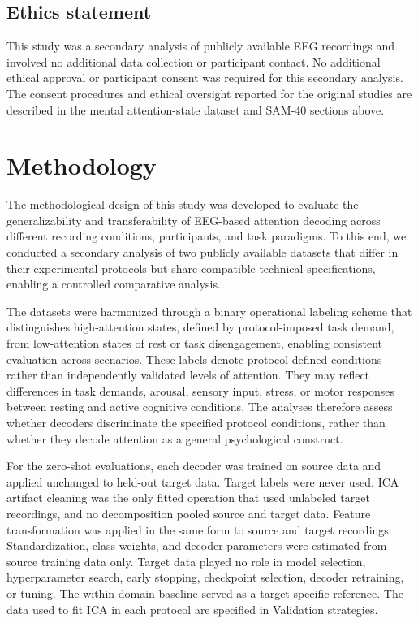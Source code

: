 \documentclass[10pt,letterpaper]{article}
\newcommand{\rev}[1]{#1}
\begin{document}
\subsection*{Ethics statement}

This study was a secondary analysis of publicly available EEG recordings and involved no additional data collection or participant contact. No additional ethical approval or participant consent was required for this secondary analysis. The consent procedures and ethical oversight reported for the original studies are described in the mental attention-state dataset and SAM-40 sections above.

\section*{Methodology}

The methodological design of this study was developed to evaluate the generalizability and transferability of EEG-based attention decoding across different recording conditions, participants, and task paradigms. To this end, we conducted a secondary analysis of two publicly available datasets that differ in their experimental protocols but share compatible technical specifications, enabling a controlled comparative analysis.

\rev{The datasets were harmonized through a binary operational labeling scheme that
distinguishes high-attention states, defined by protocol-imposed task demand,
from low-attention states of rest or task disengagement, enabling consistent
evaluation across scenarios. These labels denote protocol-defined conditions
rather than independently validated levels of attention. They may reflect
differences in task demands, arousal, sensory input, stress, or motor responses
between resting and active cognitive conditions. The analyses therefore assess
whether decoders discriminate the specified protocol conditions, rather than
whether they decode attention as a general psychological construct.}

\rev{For the zero-shot evaluations, each decoder was trained on source data and applied unchanged to held-out target data. Target labels were never used. ICA artifact cleaning was the only fitted operation that used unlabeled target recordings, and no decomposition pooled source and target data. Feature transformation was applied in the same form to source and target recordings. Standardization, class weights, and decoder parameters were estimated from source training data only. Target data played no role in model selection, hyperparameter search, early stopping, checkpoint selection, decoder retraining, or tuning. The within-domain baseline served as a target-specific reference. The data used to fit ICA in each protocol are specified in Validation strategies.}
\end{document}
